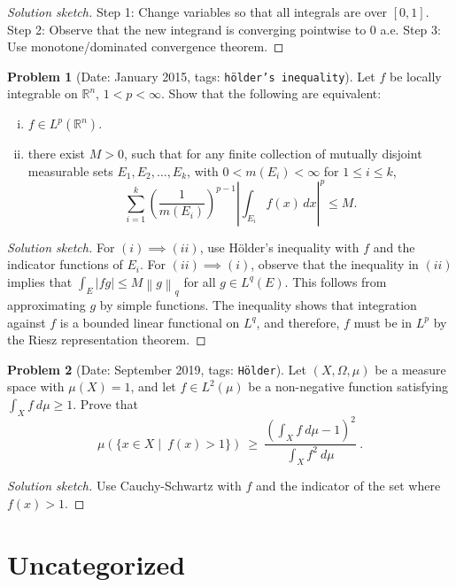 \documentclass[11pt, notitlepage]{article}
\theoremstyle{definition}
\theoremstyle{definition}
\theoremstyle{definition}
\newtheorem{probstate}{Problem}
\theoremstyle{remark}
\newenvironment{problem}[2]{
    \begin{probstate}[Date: #1, tags: {\color{white} \texttt{#2}}]
}
{
  \end{probstate}
}
\newenvironment{sketch}{
    \begin{proof}[Solution sketch]
}
{
    \end{proof}
}
\newcommand{\norm}[1]{{\left\|#1\right\|}}
\begin{document}
\begin{sketch}
Step 1: Change variables so that all integrals are over $[0,1]$.
Step 2: Observe that the new integrand is converging pointwise to $0$ a.e.
Step 3: Use monotone/dominated convergence theorem.
\end{sketch}


\begin{problem}{January 2015}{h\"older's inequality}
Let $f$ be locally integrable on $\mathbb R^n$, $1<p<\infty$. Show that the following are equivalent:

\begin{enumerate}[(i)]
    \item $f\in L^p(\mathbb R^n)$.
    \item there exist $M>0$, such that for any finite collection of mutually disjoint measurable sets $E_1, E_2,\dots, E_k$, with $0<m(E_i) <\infty$ for $1\le i\le k$,
$$\sum_{i=1}^k \left(\frac1{m(E_i)}\right)^{p-1}\left|\int_{E_i} f(x)\,dx\right|^p\le M.$$
\end{enumerate}
\end{problem}

\begin{sketch}
  For $(i) \implies (ii)$, use H\"older's inequality with $f$ and the indicator functions of $E_i$. For $(ii) \implies (i)$, observe that the inequality in $(ii)$ implies that $\int_E |fg| \leq M \norm{g}_q$ for all $g \in L^q(E)$. This follows from approximating $g$ by simple functions.
  The inequality shows that integration against $f$ is a bounded linear functional on $L^q$, and therefore, $f$ must be in $L^p$ by the Riesz representation theorem.
\end{sketch}


\begin{problem}{September 2019}{Hölder}
  Let $(X,\Omega,\mu)$ be a measure space with $\mu(X)=1$, and let $f\in L^2(\mu)$ be a non-negative function satisfying $\int_X f \ d\mu\ge 1$. Prove that
$$
\mu\left(\{x\in X  \mid \ f(x)>1\}\right) \ \ge \  \frac{\left(\int_{X} f \ d\mu-1\right)^2}{\int_X f^2 \ d\mu} \ .
$$
\end{problem}

\begin{sketch}
Use Cauchy-Schwartz with $f$ and the indicator of the set where $f(x) > 1$.
\end{sketch}

\section{Uncategorized}
\end{document}
